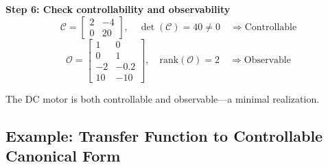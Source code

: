 \begin{example}
\textbf{Step 6: Check controllability and observability}
\begin{equation}
\mathcal{C} = \begin{bmatrix} 2 & -4 \\ 0 & 20 \end{bmatrix}, \quad \det(\mathcal{C}) = 40 \neq 0 \quad \Rightarrow \text{Controllable}
\end{equation}
\begin{equation}
\mathcal{O} = \begin{bmatrix} 1 & 0 \\ 0 & 1 \\ -2 & -0.2 \\ 10 & -10 \end{bmatrix}, \quad \text{rank}(\mathcal{O}) = 2 \quad \Rightarrow \text{Observable}
\end{equation}

The DC motor is both controllable and observable---a minimal realization.
\end{example}

\subsection{Example: Transfer Function to Controllable Canonical Form}

